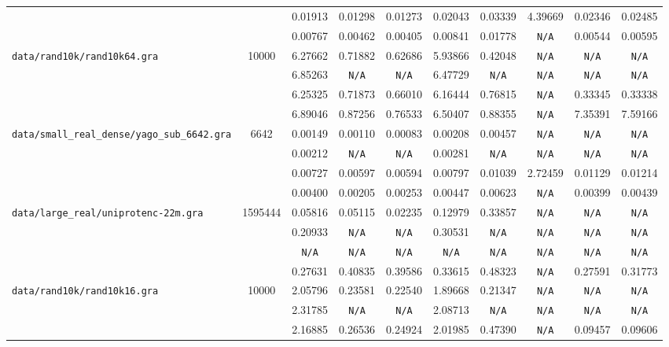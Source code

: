 \documentclass[12pt,a4paper,twoside]{article}
\begin{document}
{\begin{tabular}{ | l | c | c | c | c | c | c | c | c | c | }
\verb| | &  & 0.01913 & 0.01298 & 0.01273 & 0.02043 & 0.03339 & 4.39669 & 0.02346 & 0.02485 \\
\verb| | &  & 0.00767 & 0.00462 & 0.00405 & 0.00841 & 0.01778 & \verb|N/A| & 0.00544 & 0.00595 \\
\hline
\verb|data/rand10k/rand10k64.gra| & 10000 & 6.27662 & 0.71882 & 0.62686 & 5.93866 & 0.42048 & \verb|N/A| & \verb|N/A| & \verb|N/A| \\
\verb| | &  & 6.85263 & \verb|N/A| & \verb|N/A| & 6.47729 & \verb|N/A| & \verb|N/A| & \verb|N/A| & \verb|N/A| \\
\verb| | &  & 6.25325 & 0.71873 & 0.66010 & 6.16444 & 0.76815 & \verb|N/A| & 0.33345 & 0.33338 \\
\verb| | &  & 6.89046 & 0.87256 & 0.76533 & 6.50407 & 0.88355 & \verb|N/A| & 7.35391 & 7.59166 \\
\hline
\verb|data/small_real_dense/yago_sub_6642.gra| & 6642 & 0.00149 & 0.00110 & 0.00083 & 0.00208 & 0.00457 & \verb|N/A| & \verb|N/A| & \verb|N/A| \\
\verb| | &  & 0.00212 & \verb|N/A| & \verb|N/A| & 0.00281 & \verb|N/A| & \verb|N/A| & \verb|N/A| & \verb|N/A| \\
\verb| | &  & 0.00727 & 0.00597 & 0.00594 & 0.00797 & 0.01039 & 2.72459 & 0.01129 & 0.01214 \\
\verb| | &  & 0.00400 & 0.00205 & 0.00253 & 0.00447 & 0.00623 & \verb|N/A| & 0.00399 & 0.00439 \\
\hline
\verb|data/large_real/uniprotenc-22m.gra| & 1595444 & 0.05816 & 0.05115 & 0.02235 & 0.12979 & 0.33857 & \verb|N/A| & \verb|N/A| & \verb|N/A| \\
\verb| | &  & 0.20933 & \verb|N/A| & \verb|N/A| & 0.30531 & \verb|N/A| & \verb|N/A| & \verb|N/A| & \verb|N/A| \\
\verb| | &  & \verb|N/A| & \verb|N/A| & \verb|N/A| & \verb|N/A| & \verb|N/A| & \verb|N/A| & \verb|N/A| & \verb|N/A| \\
\verb| | &  & 0.27631 & 0.40835 & 0.39586 & 0.33615 & 0.48323 & \verb|N/A| & 0.27591 & 0.31773 \\
\hline
\verb|data/rand10k/rand10k16.gra| & 10000 & 2.05796 & 0.23581 & 0.22540 & 1.89668 & 0.21347 & \verb|N/A| & \verb|N/A| & \verb|N/A| \\
\verb| | &  & 2.31785 & \verb|N/A| & \verb|N/A| & 2.08713 & \verb|N/A| & \verb|N/A| & \verb|N/A| & \verb|N/A| \\
\verb| | &  & 2.16885 & 0.26536 & 0.24924 & 2.01985 & 0.47390 & \verb|N/A| & 0.09457 & 0.09606 \\

\end{tabular}}
\end{document}
